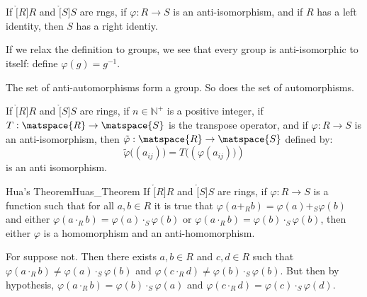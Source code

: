 \documentclass{book}                                                           %
\begin{document}
            \begin{theorem}
                If $\ring[R]{R}$ and $\ring[S]{S}$ are rngs, if
                $\varphi:R\rightarrow{S}$ is an anti-isomorphism, and if
                $R$ has a left identity, then $S$ has a right identiy.
            \end{theorem}
            If we relax the definition to groups, we see that every group is
            anti-isomorphic to itself: define $\varphi(g)=g^{\minus{1}}$.
            \begin{theorem}
                The set of anti-automorphisms form a group. So does the set
                of automorphisms.
            \end{theorem}
            \begin{theorem}
                If $\ring[R]{R}$ and $\ring[S]{S}$ are rings, if
                $n\in\mathbb{N}^{+}$ is a positive integer, if
                $T:\matspace{R}\rightarrow\matspace{S}$ is the transpose
                operator, and if $\varphi:R\rightarrow{S}$ is an
                anti-isomorphism, then
                $\tilde{\varphi}:\matspace{R}\rightarrow\matspace{S}$
                defined by:
                \begin{equation}
                    \tilde{\varphi}\big((a_{ij})\big)
                        =T\big((\varphi(a_{ij})\big))
                \end{equation}
                is an anti isomorphism.
            \end{theorem}
            \begin{ftheorem}{Hua's Theorem}{Huas_Theorem}
                If $\ring[R]{R}$ and $\ring[S]{S}$ are rings, if
                $\varphi:R\rightarrow{S}$ is a function such that for all
                $a,b\in{R}$ it is true that
                $\varphi(a+_{R}b)=\varphi(a)+_{S}\varphi(b)$ and either
                $\varphi(a\cdot_{R}b)=\varphi(a)\cdot_{S}\varphi(b)$ or
                $\varphi(a\cdot_{R}b)=\varphi(b)\cdot_{S}\varphi(b)$, then
                either $\varphi$ is a homomorphism and an anti-homomorphism.
            \end{ftheorem}
            \begin{bproof}
                For suppose not. Then there exists $a,b\in{R}$ and
                $c,d\in{R}$ such that
                $\varphi(a\cdot_{R}b)\ne\varphi(a)\cdot_{S}\varphi(b)$ and
                $\varphi(c\cdot_{R}d)\ne\varphi(b)\cdot_{S}\varphi(b)$. But
                then by hypothesis,
                $\varphi(a\cdot_{R}b)=\varphi(b)\cdot_{S}\varphi(a)$ and
                $\varphi(c\cdot_{R}d)=\varphi(c)\cdot_{S}\varphi(d)$.
            \end{bproof}
\end{document}
